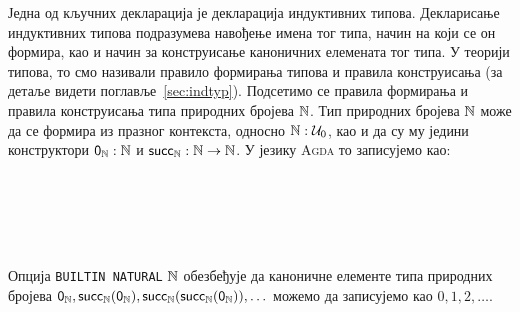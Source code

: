 Једна од кључних декларација је декларација индуктивних типова. Декларисање индуктивних типова подразумева навођење имена тог типа, начин на који се он формира, као и начин за конструисање каноничних елемената тог типа. У теорији типова, то смо називали правило формирања типова и правила конструисања (за детаље видети поглавље~\ref{sec:indtyp}). Подсетимо се правила формирања и правила конструисања типа природних бројева ${\mathbb{N}}$. Тип природних бројева ${\mathbb{N}}$ може да се формира из празног контекста, односно ${\mathbb{N}} : \mathcal{U}_0$, као и да су му једини конструктори $\mathsf{0}_\mathbb{N} : {\mathbb{N}}$ и $\mathsf{succ}_\mathbb{N} : {\mathbb{N}} \to {\mathbb{N}}$. У језику \textsc{Agda} то записујемо као: 
\begin{code}%
\>[0]\AgdaSpace{}%
\AgdaSpace{}%
\AgdaSymbol{:}\AgdaSpace{}%
\AgdaSpace{}%
\AgdaSpace{}%
\<%
\\
\>[0][@{}l@{\AgdaIndent{0}}]%
\>[4]\AgdaSpace{}%
\AgdaSymbol{:}\AgdaSpace{}%
\<%
\\
%
\>[4]\AgdaSpace{}%
\AgdaSymbol{:}\AgdaSpace{}%
\AgdaSpace{}%
\AgdaSpace{}%
\<%
\\
\>[0]\<%
\\
\>[0]\AgdaSymbol{\{-\#}\AgdaSpace{}%
\AgdaSpace{}%
\AgdaSpace{}%
\AgdaSpace{}%
\AgdaSymbol{\#-\}}\<%
\end{code}
Опција \texttt{BUILTIN NATURAL} ${\mathbb{N}}$ обезбеђује да каноничне елементе типа природних бројева $\mathsf{0}_\mathbb{N}, \mathsf{succ}_\mathbb{N}(\mathsf{0}_\mathbb{N}), \mathsf{succ}_\mathbb{N}(\mathsf{succ}_\mathbb{N}(\mathsf{0}_\mathbb{N})), \ldots$ можемо да записујемо као $0, 1, 2, \ldots$. 

